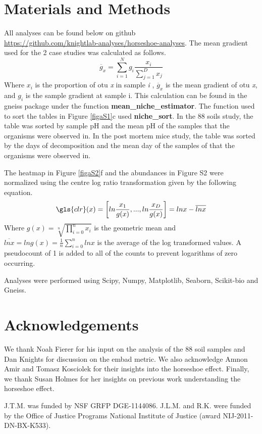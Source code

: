 \section{Materials and Methods}
All analyses can be found below on github \\
\url{https://github.com/knightlab-analyses/horseshoe-analyses}.
The mean gradient used for the 2 case studies was calculated as follows.
\begin{equation}
        \overline{g}_{x}=\sum_{i=1}^{N}g_{i}\frac{x_{i}}{\sum_{j=1}^{D}x_{j}}
\end{equation}
Where $x_{i}$ is the proportion of \gls{otu} \textit{x} in sample \textit{i} , $\overline{g}_{x}$ is the mean gradient of \gls{otu} \textit{x}, and $g_{i}$  is the sample gradient at sample i. This calculation can be found in the gneiss package under the function \textbf{mean\_niche\_estimator}. The function used to sort the tables in Figure \ref{figaS1}c used \textbf{niche\_sort}. In the 88 soils study, the table was sorted by sample pH and the mean pH of the samples that the organisms were observed in. In the post mortem mice study, the table was sorted by the days of decomposition and the mean day of the samples of that the organisms were observed in.\par
The heatmap in Figure \ref{figaS2}f and the abundances in Figure S2 were normalized using the centre log ratio transformation given by the following equation.
\begin{equation}
        \gls{clr}(x)=\left [ ln\frac{x_{1}}{g(x)},...,ln\frac{x_{D}}{g(x)} \right ]=lnx-\overline{lnx}
\end{equation}
Where $g(x)=\sqrt[n]{\prod_{i=0}^{n}x_{i}}$ is the geometric mean and $\overline{lnx}=lng(x)=\frac{1}{n}\sum_{i=0}^{n}lnx$ is the average of the log transformed values.  A pseudocount of 1 is added to all of the counts to prevent logarithms of zero occurring. \par
Analyses were performed using Scipy, Numpy, Matplotlib, Seaborn, Scikit-bio and Gneiss.
\section{Acknowledgements}
We thank Noah Fierer for his input on the analysis of the 88 soil samples and Dan Knights for discussion on the \gls{embad} metric. We also acknowledge Amnon Amir and Tomasz Kosciolek for their insights into the horseshoe effect. Finally, we thank Susan Holmes for her insights on previous work understanding the horseshoe effect.

J.T.M. was funded by NSF GRFP DGE-1144086. J.L.M. and R.K. were funded by the Office of Justice Programs National Institute of Justice (award NIJ-2011-DN-BX-K533).
